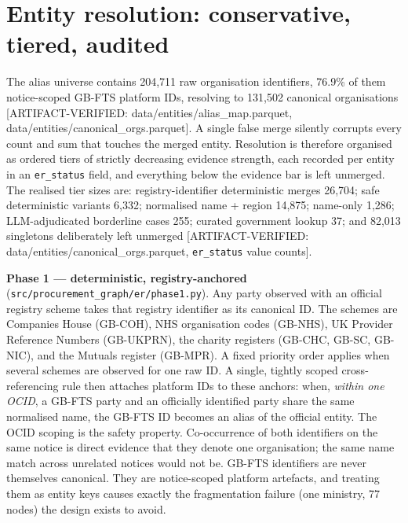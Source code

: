 \documentclass[10pt]{article} %
\begin{document}
\section{Entity resolution: conservative, tiered, audited}\label{sec:entity-resolution-conservative-tiered-au}

The alias universe contains 204,711 raw organisation identifiers, 76.9\% of them notice-scoped GB-FTS platform IDs, resolving to 131,502 canonical organisations [ARTIFACT-VERIFIED: data/entities/alias\_map.parquet, data/entities/canonical\_orgs.parquet]. A single false merge silently corrupts every count and sum that touches the merged entity. Resolution is therefore organised as ordered tiers of strictly decreasing evidence strength, each recorded per entity in an \texttt{er\_status} field, and everything below the evidence bar is left unmerged. The realised tier sizes are: registry-identifier deterministic merges 26,704; safe deterministic variants 6,332; normalised name + region 14,875; name-only 1,286; LLM-adjudicated borderline cases 255; curated government lookup 37; and 82,013 singletons deliberately left unmerged [ARTIFACT-VERIFIED: data/entities/canonical\_orgs.parquet, \texttt{er\_status} value counts].

\textbf{Phase 1 --- deterministic, registry-anchored} (\texttt{src/procurement\_graph/er/phase1.py}). Any party observed with an official registry scheme takes that registry identifier as its canonical ID. The schemes are Companies House (GB-COH), NHS organisation codes (GB-NHS), UK Provider Reference Numbers (GB-UKPRN), the charity registers (GB-CHC, GB-SC, GB-NIC), and the Mutuals register (GB-MPR). A fixed priority order applies when several schemes are observed for one raw ID. A single, tightly scoped cross-referencing rule then attaches platform IDs to these anchors: when, \emph{within one OCID}, a GB-FTS party and an officially identified party share the same normalised name, the GB-FTS ID becomes an alias of the official entity. The OCID scoping is the safety property. Co-occurrence of both identifiers on the same notice is direct evidence that they denote one organisation; the same name match across unrelated notices would not be. GB-FTS identifiers are never themselves canonical. They are notice-scoped platform artefacts, and treating them as entity keys causes exactly the fragmentation failure (one ministry, 77 nodes) the design exists to avoid.
\end{document}
